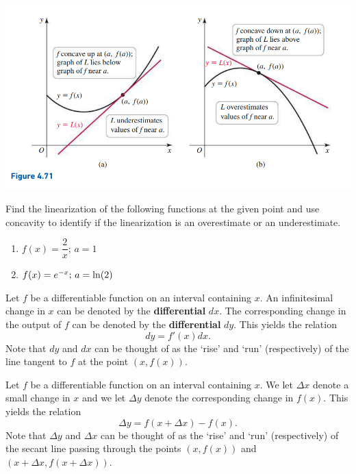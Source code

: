 \documentclass[../mathNotesPreamble]{subfiles}
\begin{document}
\begin{center}
    \includegraphics[scale=0.5]{../images/briggs_04_06/fig4_71}
\end{center}

\begin{ex*}
  Find the linearization of the following functions at the given point and use concavity to identify if the linearization is an overestimate or an underestimate.
\end{ex*}
\begin{enumerate}[label=\alph*),itemsep=\stretch{1}]
  \item $f(x)=\dfrac{2}{x};\, a=1$
  \item $f(x)=e\inv[x];\, a=\ln(2)$
\end{enumerate}
\pagebreak

\begin{defn*}[Differentials]
    Let $f$ be a differentiable function on an interval containing $x$. An infinitesimal change in $x$ can be denoted by the \textbf{differential} $dx$. The corresponding change in the output of $f$ can be denoted by the \textbf{differential} $dy$. This yields the relation
        $$dy = f'(x)dx.$$
    Note that $dy$ and $dx$ can be thought of as the `rise' and `run' (respectively) of the line tangent to $f$ at the point $(x,f(x))$.
\end{defn*}

\begin{defn*}
    Let $f$ be a differentiable function on an interval containing $x$. We let $\Delta x$ denote a small change in $x$ and we let $\Delta y$ denote the corresponding change in $f(x)$. This yields the relation
        $$\Delta y = f(x+\Delta x) - f(x).$$
    Note that $\Delta y$ and $\Delta x$ can be thought of as the `rise' and `run' (respectively) of the secant line passing through the points $(x,f(x))$ and $(x+\Delta x, f(x+\Delta x))$.
\end{defn*}
\end{document}
